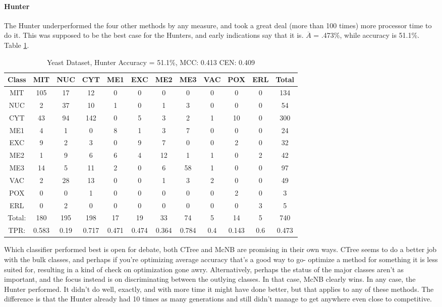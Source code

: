 \begin{table}[h!]
	\paragraph{Hunter}
The Hunter underperformed the four other methods by any measure, and took a great deal (more than 100 times) more processor time to do it.  This was supposed to be the best case for the Hunters, and early indications say that it is.  $\overline{A}$ = .473\%, while accuracy is 51.1\%.  Table \ref{tab:yeasthunter}.
\\
	\begin{tabular}{|c|c|c|c|c|c|c|c|c|c|c|c|}
		\hline
		Class&MIT&NUC&CYT&ME1&EXC&ME2&ME3&VAC&POX&ERL&Total\\
		\hline
MIT&105&17&12&0&0&0&0&0&0&0&134\\
NUC&2&37&10&1&0&1&3&0&0&0&54\\
CYT&43&94&142&0&5&3&2&1&10&0&300\\
ME1&4&1&0&8&1&3&7&0&0&0&24\\
EXC&9&2&3&0&9&7&0&0&2&0&32\\
ME2&1&9&6&6&4&12&1&1&0&2&42\\
ME3&14&5&11&2&0&6&58&1&0&0&97\\
VAC&2&28&13&0&0&1&3&2&0&0&49\\
POX&0&0&1&0&0&0&0&0&2&0&3\\
ERL&0&2&0&0&0&0&0&0&0&3&5\\
\hline
Total:&180&195&198&17&19&33&74&5&14&5&740\\
TPR:&0.583&0.19&0.717&0.471&0.474&0.364&0.784&0.4&0.143&0.6&0.473\\

		\hline
	\end{tabular}
	\caption[Yeast: Hunter]{Yeast Dataset, Hunter Accuracy = 51.1\%, MCC: 0.413 CEN: 0.409}
	\label{tab:yeasthunter}
\end{table}

Which classifier performed best is open for debate, both CTree and McNB are promising in their own ways.  CTree seems to do a better job with the bulk classes, and perhaps if you're optimizing average accuracy that's a good way to go- optimize a method for something it is less suited for, resulting in a kind of check on optimization gone awry.  Alternatively, perhaps the status of the major classes aren't as important, and the focus instead is on discriminating between the outlying classes.  In that case, McNB clearly wins.  In any case, the Hunter performed.  It didn't do well, exactly, and with more time it might have done better, but that applies to any of these methods.  The difference is that the Hunter already had 10 times as many generations and still didn't manage to get anywhere even close to competitive.

